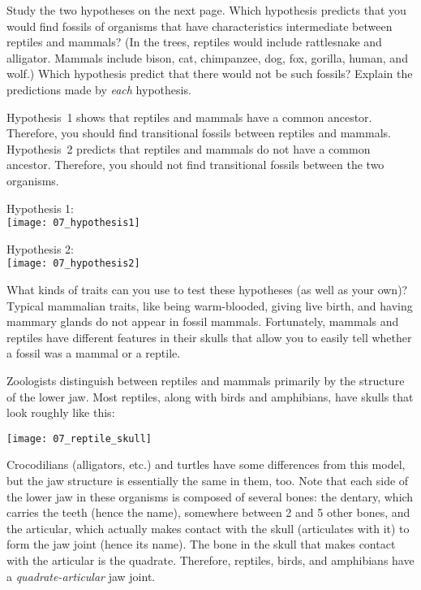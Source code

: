\documentclass[12pt, hidelinks]{exam}
\newcommand*\AnswerBox[2]{%
    \parbox[t][#1]{0.92\textwidth}{%
    \begin{solution}#2\end{solution}}
}
\begin{document}
\begin{questions}

\question[4]
Study the two hypotheses on the next page.  Which hypothesis predicts that you would find fossils of organisms that have characteristics intermediate between reptiles and mammals? (In the trees, reptiles would include rattlesnake and alligator.  Mammals include bison, cat, chimpanzee, dog, fox, gorilla, human, and wolf.) Which hypothesis predict that there would not be such fossils?  Explain the predictions made by \textit{each} hypothesis.

\AnswerBox{3\baselineskip}{%
Hypothesis~1 shows that reptiles and mammals have a common ancestor. Therefore, you should find transitional fossils between reptiles and mammals.  Hypothesis~2 predicts that reptiles and mammals do not have a common ancestor. Therefore, you should not find transitional fossils between the two organisms.
}

\newpage
Hypothesis 1:\\[1ex]
\texttt{[image: 07\_hypothesis1]}\label{hypothesis1}

\vspace*{\baselineskip}

Hypothesis 2:\\[1ex]
\texttt{[image: 07\_hypothesis2]}

What kinds of traits can you use to test these hypotheses (as well as your own)? Typical mammalian traits, like being warm-blooded, giving live birth, and having mammary glands do not appear in fossil mammals. Fortunately, mammals and reptiles have different features in their skulls that allow you to easily tell whether a fossil was a mammal or a reptile.  

Zoologists distinguish between reptiles and mammals primarily by the structure of the lower jaw.  Most reptiles, along with birds and amphibians, have skulls that look roughly like this:

	\begin{center}\texttt{[image: 07\_reptile\_skull]}\end{center}

Crocodilians (alligators, etc.) and turtles have some differences from this model, but the jaw structure is essentially the same in them, too.  Note that each side of the lower jaw in these organisms is composed of several bones:  the dentary, which carries the teeth (hence the name), somewhere between 2 and 5 other bones, and the articular, which actually makes contact with the skull (articulates with it) to form the jaw joint (hence its name).  The bone in the skull that makes contact with the articular is the quadrate.  Therefore, reptiles, birds, and amphibians have a \emph{quadrate-articular} jaw joint.  


\end{questions}
\end{document}
